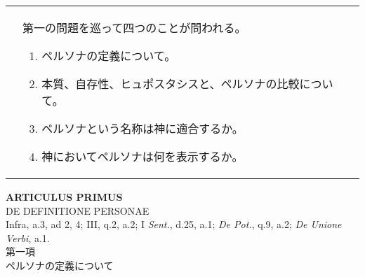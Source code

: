 \documentclass[10pt]{jsarticle} %
\begin{document}
\begin{longtable}{p{21em}p{21em}}
&



第一の問題を巡って四つのことが問われる。

\begin{enumerate}
 \item ペルソナの定義について。
 \item 本質、自存性、ヒュポスタシスと、ペルソナの比較について。
 \item ペルソナという名称は神に適合するか。
 \item 神においてペルソナは何を表示するか。
\end{enumerate}


\end{longtable}



\newpage




\begin{center}
 {\Large {\bf ARTICULUS PRIMUS}}\\
 {\large DE DEFINITIONE PERSONAE}\\
 {\footnotesize Infra, a.3, ad 2, 4; III, q.2, a.2; I {\itshape Sent.},
 d.25, a.1; {\itshape De Pot.}, q.9, a.2; {\itshape De Unione Verbi}, a.1.}\\
 {\Large 第一項\\ペルソナの定義について}
\end{center}
\end{document}
